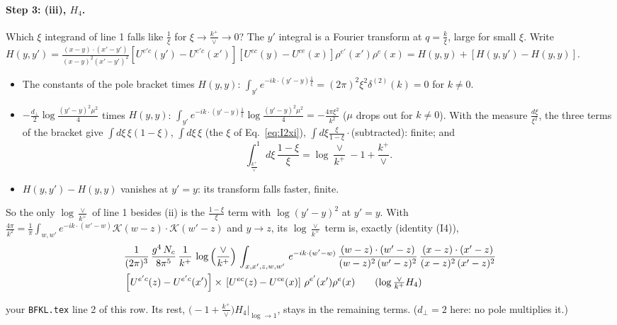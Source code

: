\documentclass[10pt]{article}
\numberwithin{equation}{section}
\newcommand{\Kc}{\mathcal K}
\begin{document}
\paragraph{Step 3: (iii), $H_4$.} Which $\xi$ integrand of line 1 falls like $\frac{1}{\xi}$ for $\xi\to\frac{k^+}{\vee}\to0$? The $y'$ integral is a Fourier transform at $q=\frac{k}{\xi}$, large for small $\xi$. Write $H(y,y')=\frac{(x-y)\cdot(x'-y')}{(x-y)^2(x'-y')^2}[U^{e'c}(y')-U^{e'c}(x')][U^{ec}(y)-U^{ce}(x)]\rho^{e'}(x')\rho^e(x)=H(y,y)+[H(y,y')-H(y,y)]$.
\begin{itemize}
\item The constants of the pole bracket times $H(y,y)$: $\int_{y'}e^{-ik\cdot(y'-y)\frac1\xi}=(2\pi)^2\xi^2\delta^{(2)}(k)=0$ for $k\neq0$.
\item $-\frac{d_\perp}{2}\log\frac{(y'-y)^2\mu^2}{4}$ times $H(y,y)$: $\int_{y'}e^{-ik\cdot(y'-y)\frac1\xi}\log\frac{(y'-y)^2\mu^2}{4}=-\frac{4\pi\xi^2}{k^2}$ ($\mu$ drops out for $k\neq0$). With the measure $\frac{d\xi}{\xi^2}$, the three terms of the bracket give $\int d\xi\,\xi(1-\xi)$, $\int d\xi\,\xi$ (the $\xi$ of Eq.~\eqref{eq:I2xi}), $\int d\xi\frac{\xi}{1-\xi}\cdot$(subtracted): finite; and
\begin{equation}
\int_{\frac{k^+}{\vee}}^1d\xi\,\frac{1-\xi}{\xi}=\log\frac{\vee}{k^+}-1+\frac{k^+}{\vee}.
\end{equation}
\item $H(y,y')-H(y,y)$ vanishes at $y'=y$: its transform falls faster, finite.
\end{itemize}
So the only $\log\frac{\vee}{k^+}$ of line 1 besides (ii) is the $\frac{1-\xi}{\xi}$ term with $\log(y'-y)^2$ at $y'=y$. With $\frac{4\pi}{k^2}=\frac{1}{\pi}\int_{w,w'}e^{-ik\cdot(w'-w)}\Kc(w-z)\cdot\Kc(w'-z)$ and $y\to z$, its $\log\frac{\vee}{k^+}$ term is, exactly (identity (I4)),
\begin{align}
&\frac{1}{(2\pi)^{3}}\,\frac{g^{4}\,N_{c}}{8\pi^{5}}\,\frac{1}{k^{+}}\,\log{\left(\frac{\vee}{k^{+}}\right)}\,\int_{x,x',z,w,w'}\,e^{-ik\cdot (w'-w)}\,\frac{(w-z)\cdot(w'-z)}{(w-z)^{2}\,(w'-z)^{2}}\,\frac{(x-z)\cdot(x'-z)}{(x-z)^{2}\,(x'-z)^{2}}\notag \\ & \left[U^{e'c}(z) - U^{e'c}(x')\right] \times\, \left[U^{ec}(z) - U^{ce}(x)\right]\, \rho^{e'}(x') \rho^{e}(x)\tag{$\log\frac{\vee}{k^+}H_4$}
\end{align}

your \texttt{BFKL.tex} line 2 of this row. Its rest, $\big(-1+\frac{k^+}{\vee}\big)H_4\big|_{\log\to1}$, stays in the remaining terms. ($d_\perp=2$ here: no pole multiplies it.)
\end{document}
